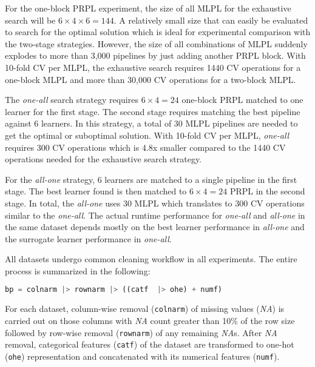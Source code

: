 \documentclass{juliacon}
\begin{document}
For the one-block PRPL experiment, the size of all MLPL  for the exhaustive
search will be $6\times4\times6 = 144$.  A relatively small size that can
easily be evaluated to search for the optimal solution which is ideal for
experimental comparison with the two-stage strategies. However, the size of all
combinations of MLPL suddenly explodes to more than 3,000 pipelines by just
adding another PRPL block. With 10-fold CV per MLPL,
the exhaustive search requires 1440 CV operations
for a one-block MLPL and more than 30,000 CV operations for a two-block MLPL.

\vskip 6pt

The \emph{one-all} search strategy requires $6\times4 = 24$ one-block PRPL
matched to one learner for the first stage. The second stage requires matching
the best pipeline against 6 learners.  In this strategy, a total of 30 MLPL
pipelines are needed to get the optimal or suboptimal solution.  With 10-fold
CV per MLPL, \emph{one-all} requires 300 CV operations which is 4.8x smaller
compared to the 1440 CV operations needed for the exhaustive search strategy.

\vskip 6pt

For the \emph{all-one} strategy, 6 learners are matched to a single pipeline in the
first stage. The best learner found is then matched to $6\times4 = 24$ PRPL in
the second stage.  In total, the \emph{all-one} uses 30 MLPL which translates
to 300 CV operations similar to the \emph{one-all}. The actual
runtime performance for \emph{one-all} and \emph{all-one} in the same
dataset depends mostly on the best learner performance in
\emph{all-one} and the surrogate learner performance in \emph{one-all}.

\vskip 6pt

All datasets undergo common cleaning workflow in all experiments.
The entire process is summarized in the following:

\begin{lstlisting}[language = Julia,numbers=none]
bp = colnarm |> rownarm |> ((catf  |> ohe) + numf)
\end{lstlisting}

\vskip 6pt

For each dataset, column-wise removal (\texttt{colnarm})
of missing values (\emph{NA}) is carried out on
those columns with \emph{NA} count
greater than 10\% of the row size followed by
row-wise removal (\texttt{rownarm})
of any remaining \emph{NA}s.
After \emph{NA} removal, categorical features (\texttt{catf}) of the
dataset are transformed to one-hot (\texttt{ohe})
representation and concatenated with its numerical
features (\texttt{numf}).
\end{document}
